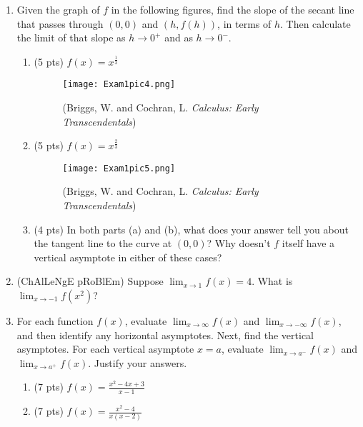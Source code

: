\documentclass[11pt,letterpaper]{article}
\begin{document}
\begin{enumerate}
\newpage
\item Given the graph of $f$ in the following figures, find the slope of the secant line that passes through $(0,0)$ and $(h,f(h))$, in terms of $h$.  Then calculate the limit of that slope as $h\to 0^+$ and as $h\to 0^-$.  
\begin{enumerate}
\item (5 pts) $f(x)=x^{\frac{1}{3}}$
\vspace{-1pc}  
\begin{figure}[h]
\begin{center}
\texttt{[image: Exam1pic4.png]}
\caption{(Briggs, W. and Cochran, L. \emph{Calculus: Early Transcendentals})}
\end{center}
\end{figure}

\newpage
\item (5 pts) $f(x)=x^{\frac{2}{3}}$
\vspace{-1pc}  
\begin{figure}[h]
\begin{center}
\texttt{[image: Exam1pic5.png]}
\caption{(Briggs, W. and Cochran, L. \emph{Calculus: Early Transcendentals})}
\end{center}
\end{figure}

\newpage
\item (4 pts) In both parts (a) and (b), what does your answer tell you about the tangent line to the curve at $(0,0)$?  Why doesn't $f$ itself have a vertical asymptote in either of these cases?

\end{enumerate}

\vspace{20pc}
\item (ChAlLeNgE pRoBlEm) Suppose $\lim_{x\to 1}f(x)=4$.  What is $\lim_{x\to -1}f(x^2)$? 

\newpage
\item For each function $f(x)$, evaluate $\lim_{x\to\infty}f(x)$ and $\lim_{x\to -\infty}f(x)$, and then identify any horizontal asymptotes.  Next, find the vertical asymptotes.  For each vertical asymptote $x=a$, evaluate $\lim_{x\to a^-}f(x)$ and $\lim_{x\to a^+}f(x)$.  Justify your answers.

\vspace{2pc}
\begin{enumerate}
\item (7 pts) $f(x)=\frac{x^2-4x+3}{x-1}$

\vspace{15pc}
\item (7 pts) $f(x)=\frac{x^2-4}{x(x-2)}$
\end{enumerate}


\end{enumerate}
\end{document}
